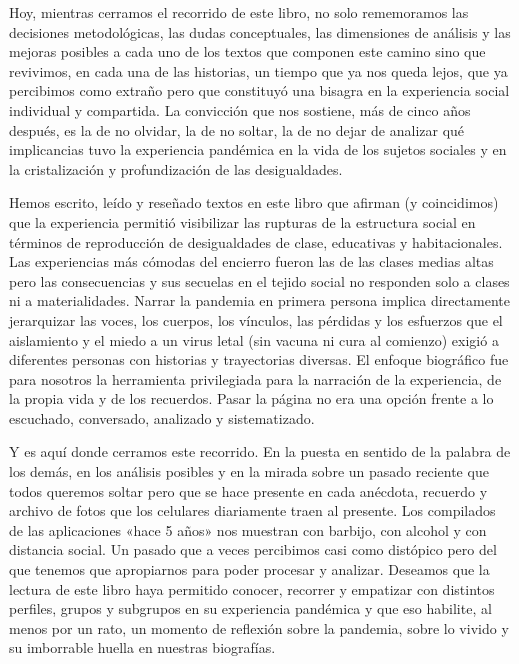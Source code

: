 Hoy, mientras cerramos el recorrido de este libro, no solo rememoramos las decisiones metodológicas, las dudas conceptuales, las dimensiones de análisis y las mejoras posibles a cada uno de los textos que componen este camino sino que revivimos, en cada una de las historias, un tiempo que ya nos queda lejos, que ya percibimos como extraño pero que constituyó una bisagra en la experiencia social individual y compartida. La convicción que nos sostiene, más de cinco años después, es la de no olvidar, la de no soltar, la de no dejar de analizar qué implicancias tuvo la experiencia pandémica en la vida de los sujetos sociales y en la cristalización y profundización de las desigualdades.~

Hemos escrito, leído y reseñado textos en este libro que afirman (y coincidimos) que la experiencia permitió visibilizar las rupturas de la estructura social en términos de reproducción de desigualdades de clase, educativas y habitacionales. Las experiencias más cómodas del encierro fueron las de las clases medias altas pero las consecuencias y sus secuelas en el tejido social no responden solo a clases ni a materialidades. Narrar la pandemia en primera persona implica directamente jerarquizar las voces, los cuerpos, los vínculos, las pérdidas y los esfuerzos que el aislamiento y el miedo a un virus letal (sin vacuna ni cura al comienzo) exigió a diferentes personas con historias y trayectorias diversas. El enfoque biográfico fue para nosotros la herramienta privilegiada para la narración de la experiencia, de la propia vida y de los recuerdos. Pasar la página no era una opción frente a lo escuchado, conversado, analizado y sistematizado.~

Y es aquí donde cerramos este recorrido. En la puesta en sentido de la palabra de los demás, en los análisis posibles y en la mirada sobre un pasado reciente que todos queremos soltar pero que se hace presente en cada anécdota, recuerdo y archivo de fotos que los celulares diariamente traen al presente. Los compilados de las aplicaciones «hace 5 años» nos muestran con barbijo, con alcohol y con distancia social. Un pasado que a veces percibimos casi como distópico pero del que tenemos que apropiarnos para poder procesar y analizar. Deseamos que la lectura de este libro haya permitido conocer, recorrer y empatizar con distintos perfiles, grupos y subgrupos en su experiencia pandémica y que eso habilite, al menos por un rato, un momento de reflexión sobre la pandemia, sobre lo vivido y su imborrable huella en nuestras biografías.
